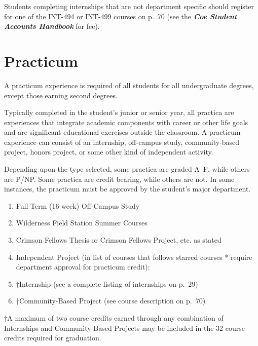 \documentclass[
  letterpaper,
]{scrbook}
\providecommand{\tightlist}{%
  \setlength{\itemsep}{0pt}\setlength{\parskip}{0pt}}
\begin{document}
Students completing internships that are not department specific should
register for one of the INT-494 or INT-499 courses on p.~70 (see the
\textbf{\emph{Coe Student Accounts Handbook}} for fee).

\hypertarget{sec-practicum}{%
\section{Practicum}\label{sec-practicum}}

A practicum experience is required of all students for all undergraduate
degrees, except those earning second degrees.

Typically completed in the student's junior or senior year, all practica
are experiences that integrate academic components with career or other
life goals and are significant educational exercises outside the
classroom. A practicum experience can consist of an internship,
off-campus study, community-based project, honors project, or some other
kind of independent activity.

Depending upon the type selected, some practica are graded A--F, while
others are P/NP. Some practica are credit bearing, while others are not.
In some instances, the practicum must be approved by the student's major
department.

\begin{enumerate}
\def\labelenumi{\arabic{enumi}.}
\tightlist
\item
  Full-Term (16-week) Off-Campus Study
\item
  Wilderness Field Station Summer Courses
\item
  Crimson Fellows Thesis or Crimson Fellows Project, etc. as stated
\item
  Independent Project (in list of courses that follows starred courses *
  require department approval for practicum credit):
\item
  †Internship (see a complete listing of internships on p.~29)
\item
  †Community-Based Project (see course description on p.~70)
\end{enumerate}

†A maximum of two course credits earned through any combination of
Internships and Community-Based Projects may be included in the 32
course credits required for graduation.
\end{document}
